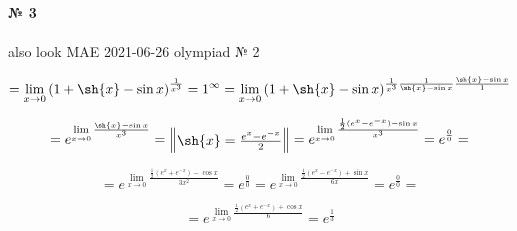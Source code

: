 \documentclass{article}
\begin{document}
\textbf{№ 3} 
\\
\\ also look MAE 2021-06-26 olympiad № 2

\begingroup

\Large

$$ = \lim\limits_{x \to 0} \left( 1+\sh{x}-\sin{x} \right)^{\frac{1}{x^3}}
= 1^{\infty}
= \lim\limits_{x \to 0} \left( 1+\sh{x}-\sin{x} \right)^{\frac{1}{x^3}\frac{1}{\sh{x}-\sin{x}}\frac{\sh{x}-\sin{x}}{1}} $$

$$ = e^{\lim\limits_{x \to 0}\frac{\sh{x}-\sin{x}}{x^3}}
= \begin{Vmatrix} \sh{x} = \frac{e^x-e^{-x}}{2} \end{Vmatrix} 
= e^{\lim\limits_{x \to 0}\frac{\frac{1}{2}(e^x-e^{-x})-\sin{x}}{x^3}}
= e^{\frac{0}{0}} 
= $$

$$ = e^{\lim\limits_{x \to 0}\frac{\frac{1}{2}(e^x+e^{-x})-\cos{x}}{3x^2}}
= e^{\frac{0}{0}}
= e^{\lim\limits_{x \to 0}\frac{\frac{1}{2}(e^x-e^{-x})+\sin{x}}{6x}}
= e^{\frac{0}{0}}
= $$

$$ = e^{\lim\limits_{x \to 0}\frac{\frac{1}{2}(e^x+e^{-x})+\cos{x}}{6}}
= e^{\frac{1}{3}}
$$

\endgroup
\end{document}
